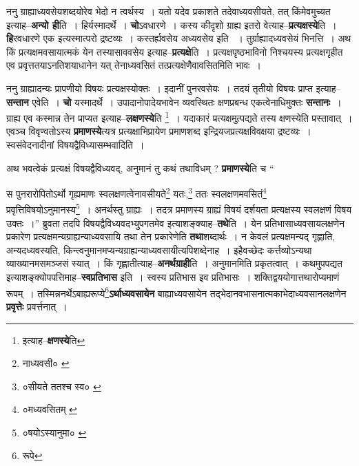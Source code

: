 \documentclass[article,12pt,a4paper]{memoir}
\begin{document}
	  \pstart ननु ग्राह्याध्यवसेयशब्दयोरेव भेदो न त्वर्थस्य । यतो यदेव प्रकाशते तदेवाध्यवसीयते, तत् किंमेवमुच्यत इत्याह--\textbf{अन्यो ही}ति । हिर्यस्मादर्थे । \textbf{चो}ऽवधारणे । कस्य कीदृशो ग्राह्य इतरो वेत्याह--\textbf{प्रत्यक्षस्ये}ति । \textbf{हि}रवधारणे एक इत्यस्मात्परो द्रष्टव्यः । कस्तर्ह्यवसेय अध्यवसेय इति \leavevmode{} । तुर्ग्राह्यादध्यवसेयं भिनत्ति । अथ किं प्रत्यक्षमवसायात्मकं येन तस्यासाववसेय इत्याह--\textbf{प्रत्यक्षे}ति । प्रत्यक्षपृष्ठभाविनो निश्चयस्य प्रत्यक्षगृहीत एव प्रवृत्ततयाऽनतिशयाधानेन यत् तेनाध्यवसितं तत्प्रत्यक्षेणैवावसितमिति भावः ।
	\pend
      

	  \pstart ननु ग्राह्यादन्यः प्रापणीयो विषयः प्रत्यक्षस्योक्तः । इदानीं पुनरवसेयः । तदयं तृतीयो विषयः प्राप्त इत्याह--\textbf{सन्तान} एवेति । \textbf{चो} यस्मादर्थे । उपादानोपादेयभावेन व्यवस्थितः क्षणप्रबन्ध एकत्वेनाधिमुक्तः \textbf{सन्तानः} । ग्राह्य एव कस्मान्न तेन प्राप्यत इत्याह--\textbf{लक्षणस्ये}ति \footnote{इत्याह--\textbf{क्षणस्ये}ति} । यदाकारं प्रत्यक्षमुत्पद्यते तस्य क्षणस्येति प्रस्तावात् । एवञ्च विवृण्वतोऽस्य \textbf{प्रमाणस्ये}त्यत्र प्रत्यक्षाभिप्रायेण प्रमाणशब्द इन्द्रियजप्रत्यक्षविवक्षया द्रष्टव्यः । स्वसंवेदनादीनां विषयद्वैविध्यासम्भवादिति ।
	\pend
      

	  \pstart अथ भवत्वेकं प्रत्यक्षं विषयद्वैविध्यवद्, अनुमानं तु कथं तथाविधम् ? \textbf{प्रमाणस्ये}ति च  \leavevmode{} “
	  
	स पुनरारोपितोऽर्थो गृह्यमाणः स्वलक्षणत्वेनावसीयते\footnote{नाध्यवसी० \cite{dp-msC} \cite{dp-msD} \cite{dp-edN}} यतः,\footnote{०सीयते ततश्च स्व० \cite{dp-msD}} ततः स्वलक्षणमवसितं\footnote{०मध्यवसितम् \cite{dp-msA} \cite{dp-msB} \cite{dp-msD} \cite{dp-edP} \cite{dp-edH} \cite{dp-edE} \cite{dp-edN}} प्रवृत्तिविषयोऽनुमानस्य\footnote{०षयोऽस्यानुमा० \cite{dp-msC} \cite{dp-msD}} । अनर्थस्तु ग्राह्यः । तदत्र प्रमाणस्य ग्राह्यं विषयं दर्शयता प्रत्यक्षस्य स्वलक्षणं विषय उक्तः ।” ब्रुवता तदपि विषयद्वैविध्यवदभ्युपगतमेव इत्याशङ्क्याह--\textbf{तथे}ति । येन प्रतिभासाध्यवसायलक्षणेन प्रकारेण प्रत्यक्षमन्यग्राह्यन्याध्यवसायि तथा तेन प्रकारेणेति \textbf{तथा}शब्दार्थः । न केवलं प्रत्यक्षमन्यद् गृह्णाति, अन्यदध्यवस्यति, किन्त्वनुमानमप्यन्यग्राह्यन्याध्यवसायीत्यपिशब्देनाह । इहैवच्छेदः कर्त्तव्योऽन्यथा व्याख्यानमसमञ्जसं स्यात् । किं गृह्णातीत्याह--\textbf{अनर्थग्राही}ति । अनुमानमिति प्रकृतत्वात् । कथमुपपद्यत इत्याशङ्क्योपपत्तिमाह--\textbf{स्वप्रतिभास} इति । स्वस्य प्रतिभास इव प्रतिभासः । शक्तिद्वययोगात्तथारोप्यमाणं रूपम् । तस्मिन्ननर्थेऽबाह्यरूप्ये\footnote{रूपे}\textbf{ऽर्थाध्यवसायेन} बाह्याध्यवसायेन तद्भेदानवभासनात्मकाभेदाध्यवसानलक्षणेन \textbf{प्रवृत्तेः} प्रवर्त्तनात् ।
	\pend
      
\end{document}
